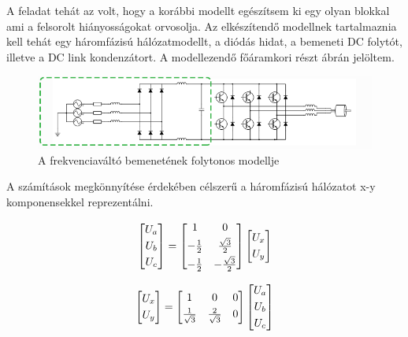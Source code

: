 A feladat tehát az volt, hogy a korábbi modellt egészítsem ki egy olyan blokkal ami a felsorolt hiányosságokat orvosolja. Az elkészítendő modellnek tartalmaznia kell tehát egy háromfázisú hálózatmodellt, a diódás hidat, a bemeneti DC folytót, illetve a DC link kondenzátort. A modellezendő főáramkori részt  ábrán jelöltem. 

\begin{figure}[H!]
	\centering
	\includegraphics[width = \textwidth]{figures/VFDschematic_choke_marked.png}
	\caption{A frekvenciaváltó bemenetének folytonos modellje} 
	\label{fig:input_marked}
\end{figure}

A számítások megkönnyítése érdekében célszerű a háromfázisú hálózatot x-y komponensekkel reprezentálni.


\begin{equation}
$$
\centering
\begin{bmatrix}
       U_a\\[0.3em]
       U_b\\[0.3em]
       U_c          
\end{bmatrix}
=
\begin{bmatrix}
       1 & 0      \\[0.3em]
       -\frac{1}{2} & \frac{\sqrt{3}}{2}       \\[0.3em]
       -\frac{1}{2} & -\frac{\sqrt{3}}{2}
\end{bmatrix}
\begin{bmatrix}
       U_x\\[0.3em]
       U_y         
\end{bmatrix}
$$    
\end{equation}

\begin{equation}
$$
\centering
\begin{bmatrix}
       U_x\\[0.3em]
       U_y 
\end{bmatrix}
=
\begin{bmatrix}
       1 & 0 & 0     \\[0.3em]
       \frac{1}{\sqrt{3}} & \frac{2}{\sqrt{3}} & 0     
\end{bmatrix}
\begin{bmatrix}
       U_a\\[0.3em]
       U_b\\[0.3em]
       U_c    
\end{bmatrix}
$$
\end{equation}

